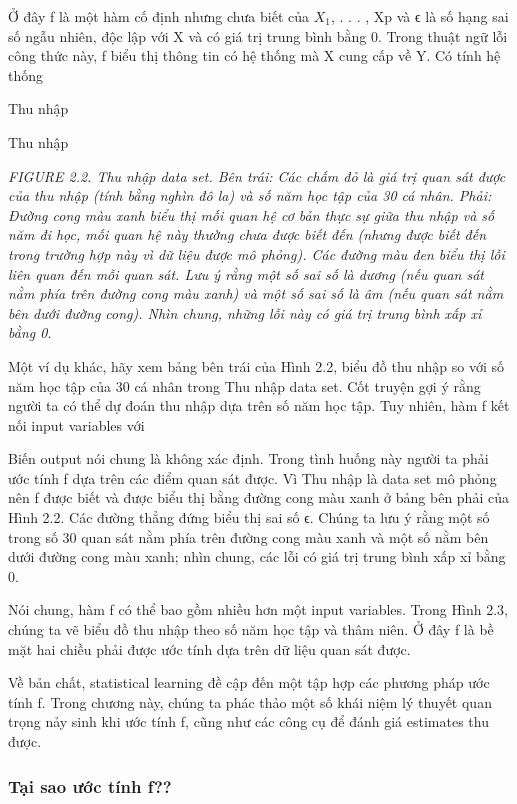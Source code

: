 Ở đây f là một hàm cố định nhưng chưa biết của $X_{1}$, . . . , Xp và ϵ là số hạng sai số ngẫu nhiên, độc lập với X và có giá trị trung bình bằng 0. Trong thuật ngữ lỗi công thức này, f biểu thị thông tin có hệ thống mà X cung cấp về Y. Có tính hệ thống

Thu nhập

Thu nhập

\noindent\textit{FIGURE 2.2. Thu nhập data set. Bên trái: Các chấm đỏ là giá trị quan sát được của thu nhập (tính bằng nghìn đô la) và số năm học tập của 30 cá nhân. Phải: Đường cong màu xanh biểu thị mối quan hệ cơ bản thực sự giữa thu nhập và số năm đi học, mối quan hệ này thường chưa được biết đến (nhưng được biết đến trong trường hợp này vì dữ liệu được mô phỏng). Các đường màu đen biểu thị lỗi liên quan đến mỗi quan sát. Lưu ý rằng một số sai số là dương (nếu quan sát nằm phía trên đường cong màu xanh) và một số sai số là âm (nếu quan sát nằm bên dưới đường cong). Nhìn chung, những lỗi này có giá trị trung bình xấp xỉ bằng 0.}

Một ví dụ khác, hãy xem bảng bên trái của Hình 2.2, biểu đồ thu nhập so với số năm học tập của 30 cá nhân trong Thu nhập data set. Cốt truyện gợi ý rằng người ta có thể dự đoán thu nhập dựa trên số năm học tập. Tuy nhiên, hàm f kết nối input variables với

Biến output nói chung là không xác định. Trong tình huống này người ta phải ước tính f dựa trên các điểm quan sát được. Vì Thu nhập là data set mô phỏng nên f được biết và được biểu thị bằng đường cong màu xanh ở bảng bên phải của Hình 2.2. Các đường thẳng đứng biểu thị sai số ϵ. Chúng ta lưu ý rằng một số trong số 30 quan sát nằm phía trên đường cong màu xanh và một số nằm bên dưới đường cong màu xanh; nhìn chung, các lỗi có giá trị trung bình xấp xỉ bằng 0.

Nói chung, hàm f có thể bao gồm nhiều hơn một input variables. Trong Hình 2.3, chúng ta vẽ biểu đồ thu nhập theo số năm học tập và thâm niên. Ở đây f là bề mặt hai chiều phải được ước tính dựa trên dữ liệu quan sát được.

Về bản chất, statistical learning đề cập đến một tập hợp các phương pháp ước tính f. Trong chương này, chúng ta phác thảo một số khái niệm lý thuyết quan trọng nảy sinh khi ước tính f, cũng như các công cụ để đánh giá estimates thu được.

\subsubsection{Tại sao ước tính f??}

